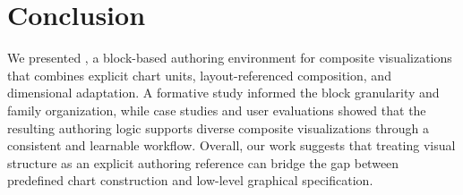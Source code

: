 \section{Conclusion}
\label{sec:conclusion}

We presented {\system}, a block-based authoring environment for composite
visualizations that combines explicit chart units, layout-referenced
composition, and dimensional adaptation. A formative study informed the block
granularity and family organization, while case studies and user evaluations
showed that the resulting authoring logic supports diverse composite
visualizations through a consistent and learnable workflow. Overall, our work
suggests that treating visual structure as an explicit authoring reference can
bridge the gap between predefined chart construction and low-level graphical
specification.